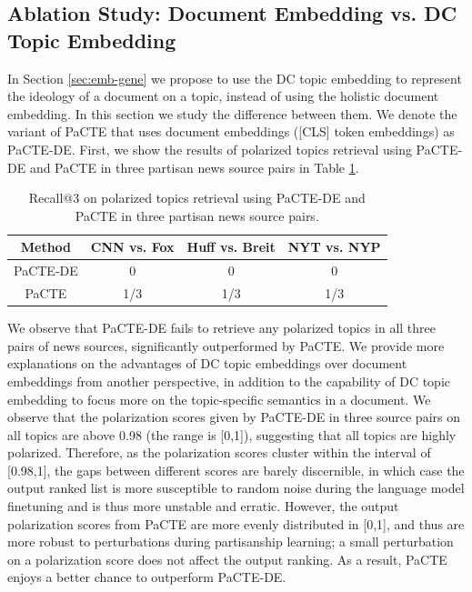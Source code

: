 \documentclass[11pt]{article}
\begin{document}
\subsection{Ablation Study: Document Embedding vs. DC Topic Embedding}
In Section \ref{sec:emb-gene} we propose to use the DC topic embedding to represent the ideology of a document on a topic, instead of using the holistic document embedding. In this section we study the difference between them.
We denote the variant of PaCTE that uses document embeddings ([CLS] token embeddings) as PaCTE-DE. First, we show the results of polarized topics retrieval using PaCTE-DE and PaCTE in three partisan news source pairs in Table \ref{tab:abl-doc-emb}.

\begin{table}[ht]
\centering
\small
\addtolength{\tabcolsep}{-3pt}
\begin{tabular}{cccc}
\hline
Method   & CNN vs. Fox & Huff vs. Breit & NYT vs. NYP \\ \hline
PaCTE-DE & 0           & 0            & 0           \\
PaCTE    & 1/3         & 1/3            & 1/3         \\ \hline
\end{tabular}
\addtolength{\tabcolsep}{3pt}
\caption{Recall@3 on polarized topics retrieval using PaCTE-DE and PaCTE in three partisan news source pairs.}
\label{tab:abl-doc-emb}
\end{table}


We observe that PaCTE-DE fails to retrieve any polarized topics in all three pairs of news sources, significantly outperformed by PaCTE.
We provide more explanations on the advantages of DC topic embeddings over document embeddings from another perspective, in addition to the capability of DC topic embedding to focus more on the topic-specific semantics in a document.  We observe that the polarization scores given by PaCTE-DE in three source pairs on all topics are above 0.98 (the range is [0,1]), suggesting that all topics are highly polarized. Therefore, as the polarization scores cluster within the interval of [0.98,1], the gaps between different scores are barely discernible, in which case the output ranked list is more susceptible to random noise during the language model finetuning and is thus more unstable and erratic. However, the output polarization scores from PaCTE are more evenly distributed in [0,1], and thus are more robust to perturbations during partisanship learning; a small perturbation on a polarization score does not affect the output ranking. As a result, PaCTE enjoys a better chance to outperform PaCTE-DE.
\end{document}
